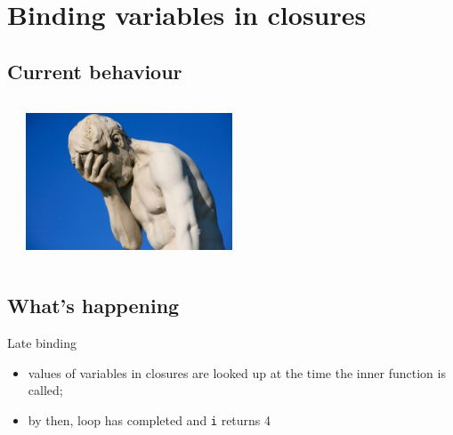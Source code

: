 \documentclass{beamer}
\begin{document}
\section{Binding variables in closures}
\subsection{Current behaviour}

\begin{frame}
    \begin{center}
        \structure{\insertsection}
    \end{center}

    
    \pause

    \begin{columns}
        \begin{column}{0.48\textwidth}
            
        \end{column}
        \begin{column}{0.48\textwidth}
            \includegraphics[width=0.48\textwidth]{images/facepalm.jpg}
        \end{column}
    \end{columns}
\end{frame}

\subsection{What's happening}
\begin{frame}
Late binding \\
\begin{itemize}
\item values of variables in closures are looked up at the time the inner function is called;
\item by then, loop has completed and \texttt{i} returns 4
\end{itemize}
\end{frame}
\end{document}
